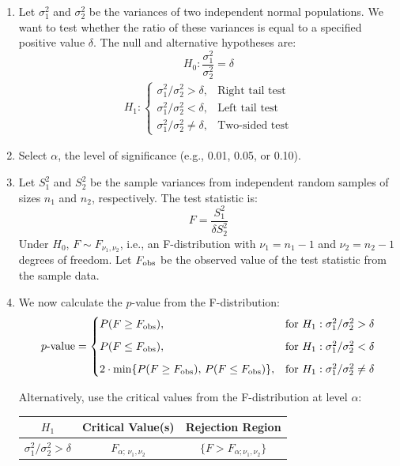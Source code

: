 \documentclass[twoside]{book}
\begin{document}
\begin{enumerate}
	\item Let \(\sigma_1^2\) and \(\sigma_2^2\) be the variances of two independent normal populations. We want to test whether the ratio of these variances is equal to a specified positive value \(\delta\). The null and alternative hypotheses are:
	\[
	H_0: \frac{\sigma_1^2}{\sigma_2^2} = \delta
	\]
    \begin{align*}
    	H_1: \begin{cases}
    	{\sigma_1^2}/{\sigma_2^2} > \delta, & \text{Right tail test}\\[6pt]
    	{\sigma_1^2}/{\sigma_2^2} < \delta, & \text{Left tail test}\\[6pt]
    	{\sigma_1^2}/{\sigma_2^2} \neq \delta, & \text{Two-sided test}
    	\end{cases}
    \end{align*}

	\item Select \(\alpha\), the level of significance (e.g., 0.01, 0.05, or 0.10).

	\item Let \(S_1^2\) and \(S_2^2\) be the sample variances from independent random samples of sizes \(n_1\) and \(n_2\), respectively. The test statistic is:
	\[
	F = \dfrac{S_1^2}{\delta S_2^2}
	\]
	Under \(H_0\), \(F \sim F_{\nu_1,\nu_2}\), i.e., an F-distribution with \(\nu_1 = n_1 - 1\) and \(\nu_2 = n_2 - 1\) degrees of freedom. Let \(F_{\rm obs}\) be the observed value of the test statistic from the sample data.

	\item We now calculate the \(p\)-value from the F-distribution:
	\[
	p\text{-value} =
	\begin{cases}
	P(F \ge F_{\rm obs}), & \text{for } H_1: {\sigma_1^2}/{\sigma_2^2} > \delta \\[6pt]
	P(F \le F_{\rm obs}), & \text{for } H_1: {\sigma_1^2}/{\sigma_2^2} < \delta \\[6pt]
	2 \cdot \min\{P(F \ge F_{\rm obs}),\, P(F \le F_{\rm obs})\}, & \text{for } H_1: {\sigma_1^2}/{\sigma_2^2} \neq \delta
	\end{cases}
	\]

	Alternatively, use the critical values from the F-distribution at level \(\alpha\):

	\begin{table}[H]
		\centering
		\begin{tabular}{@{}c|c|c@{}}
			\toprule
			\textbf{$H_1$} & \textbf{Critical Value(s)} & \textbf{Rejection Region} \\
			\midrule
			\({\sigma_1^2}/{\sigma_2^2} > \delta\) &
			\(F_{\alpha;\,\nu_1,\nu_2}\) &
			\(\{F > F_{\alpha;\nu_1,\nu_2}\}\) \\[6pt]


\end{tabular}
\end{table}
\end{enumerate}
\end{document}
